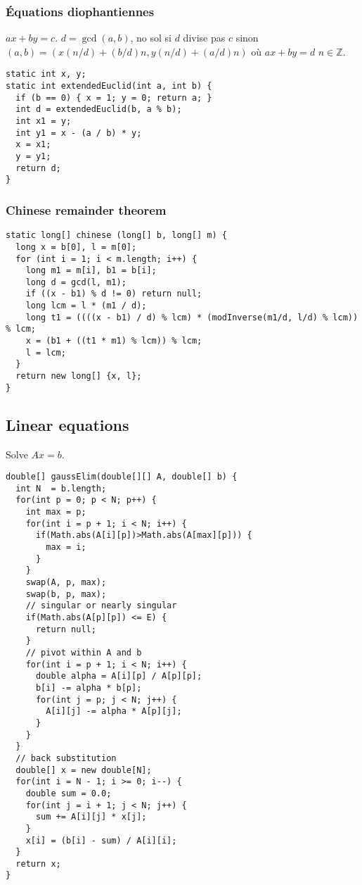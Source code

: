 \subsubsection{Équations diophantiennes}
$ax + by = c$. $d = \gcd(a,b)$, no sol si $d$ divise pas $c$ sinon $(a,b) = (x (n/d) + (b/d)n, y (n/d) + (a/d)n)$ où $ax + by = d$ $n \in \mathbb{Z}$.
\begin{lstlisting}
static int x, y;
static int extendedEuclid(int a, int b) {
  if (b == 0) { x = 1; y = 0; return a; }
  int d = extendedEuclid(b, a % b);
  int x1 = y;
  int y1 = x - (a / b) * y;
  x = x1;
  y = y1;
  return d;
}
\end{lstlisting}
\subsubsection{Chinese remainder theorem}
\begin{lstlisting}
static long[] chinese (long[] b, long[] m) {
  long x = b[0], l = m[0];
  for (int i = 1; i < m.length; i++) {
    long m1 = m[i], b1 = b[i];
    long d = gcd(l, m1);
    if ((x - b1) % d != 0) return null;
    long lcm = l * (m1 / d);
    long t1 = ((((x - b1) / d) % lcm) * (modInverse(m1/d, l/d) % lcm)) % lcm;
    x = (b1 + ((t1 * m1) % lcm)) % lcm;
    l = lcm;
  }
  return new long[] {x, l};
}
\end{lstlisting}

\subsection{Linear equations}

Solve $Ax = b$. \\

\begin{lstlisting}
double[] gaussElim(double[][] A, double[] b) {
  int N  = b.length;
  for(int p = 0; p < N; p++) {
    int max = p;
    for(int i = p + 1; i < N; i++) {
      if(Math.abs(A[i][p])>Math.abs(A[max][p])) {
        max = i;
      } 
    }
    swap(A, p, max);
    swap(b, p, max);
    // singular or nearly singular
    if(Math.abs(A[p][p]) <= E) {
      return null;
    }
    // pivot within A and b
    for(int i = p + 1; i < N; i++) {
      double alpha = A[i][p] / A[p][p];
      b[i] -= alpha * b[p];
      for(int j = p; j < N; j++) {
        A[i][j] -= alpha * A[p][j];
      }
    }
  }
  // back substitution
  double[] x = new double[N];
  for(int i = N - 1; i >= 0; i--) {
    double sum = 0.0;
    for(int j = i + 1; j < N; j++) {
      sum += A[i][j] * x[j];
    }
    x[i] = (b[i] - sum) / A[i][i];
  }
  return x;
}
\end{lstlisting}

